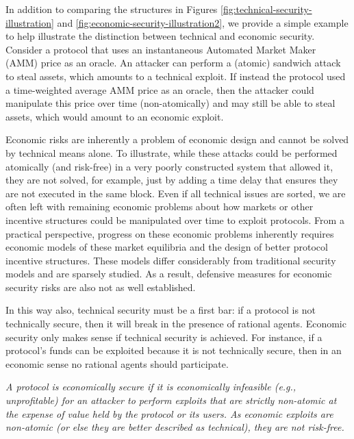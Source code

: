 In addition to comparing the structures in Figures \ref{fig:technical-security-illustration} and \ref{fig:economic-security-illustration2}, we provide a simple example to help illustrate the distinction between technical and economic security. Consider a protocol that uses an instantaneous Automated Market Maker (AMM) price as an oracle. An attacker can perform a (atomic) sandwich attack to steal assets, which amounts to a technical exploit. If instead the protocol used a time-weighted average AMM price as an oracle, then the attacker could manipulate this price over time (non-atomically) and may still be able to steal assets, which would amount to an economic exploit.

Economic risks are inherently a problem of economic design and cannot be solved by technical means alone. To illustrate, while these attacks could be performed atomically (and risk-free) in a very poorly constructed system that allowed it, they are not solved, for example, just by adding a time delay that ensures they are not executed in the same block. Even if all technical issues are sorted, we are often left with remaining economic problems about how markets or other incentive structures could be manipulated over time to exploit protocols.
From a practical perspective, progress on these economic problems inherently requires economic models of these market equilibria and the design of better protocol incentive structures. These models differ considerably from traditional security models and are sparsely studied. As a result, defensive measures for economic security risks are also not as well established.

In this way also, technical security must be a first bar: if a protocol is not technically secure, then it will break in the presence of rational agents. Economic security only makes sense if technical security is achieved. For instance, if a protocol's funds can be exploited because it is not technically secure, then in an economic sense no rational agents should participate.


\begin{tcolorbox}[boxsep=1pt,left=2pt,right=2pt,top=2pt,bottom=2pt, title=Economic Security]
	\emph{A protocol is economically secure if it is economically infeasible (e.g., unprofitable) for an attacker to perform exploits that are strictly non-atomic at the expense of value held by the protocol or its users. As economic exploits are non-atomic (or else they are better described as technical), they are not risk-free.}
\end{tcolorbox}
